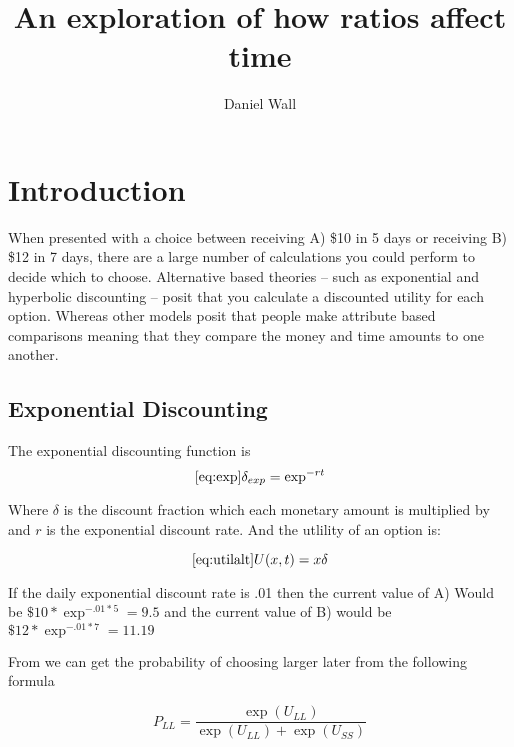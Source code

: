 \documentclass[]{article}
\title{An exploration of how ratios affect time}
\author{Daniel Wall}
\begin{document}
\maketitle

\begin{abstract}

\end{abstract}

\section{Introduction}

When presented with a choice between receiving A) \$10 in 5 days or receiving B) \$12 in 7 days, there are a large number of calculations you could perform to decide which to choose.  Alternative based theories -- such as exponential and hyperbolic discounting -- posit that you calculate a discounted utility for each option. Whereas other models posit that people make attribute based comparisons meaning that they compare the money and time amounts to one another. 

\subsection{Exponential Discounting}

The exponential discounting function is  
\begin{equation}\ref{eq:exp}
	\delta_{exp} = \exp^{-rt}
\end{equation}


Where $\delta$ is the discount fraction which each monetary amount is multiplied by and $r$ is the exponential discount rate. And the utlility of an option is:

\begin{equation}\ref{eq:utilalt}
	U(x, t) = x \delta
\end{equation}



 If the daily exponential discount rate is .01 then the current value of A) Would be $\$10 * \exp^{-.01*5} = 9.5$ and the current value of B) would be $\$12 * \exp^{-.01*7} = 11.19$

From \cite{@Toubia2014} we can get the probability of choosing larger later from the following formula

\begin{equation}\label{eq:pll}
	P_{LL} = \frac{\exp(U_{LL})}{\exp(U_{LL})+ \exp(U_{SS})}
\end{equation}
\end{document}
